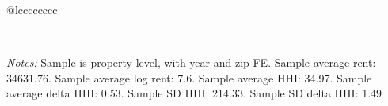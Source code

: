 \begin{table}[H]
{\begin{tabular}{@{\extracolsep{5pt}}lcccccccc}
 \hline  

 \hline \\[-1.8ex]  

  {\parbox[t]{\textwidth}{ \textit{Notes:} Sample is property level, with year and zip FE. Sample average rent: 34631.76. Sample average log rent: 7.6. Sample average HHI: 34.97. Sample average delta HHI: 0.53. Sample SD HHI: 214.33. Sample SD delta HHI: 1.49}} \\ 

 \end{tabular}}  

 \end{table}  

 



